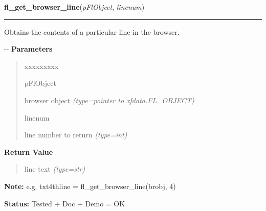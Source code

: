 \hspace{.8\funcindent}\begin{boxedminipage}{\funcwidth}

    \raggedright \textbf{fl\_get\_browser\_line}(\textit{pFlObject}, \textit{linenum})

    \vspace{-1.5ex}

    \rule{\textwidth}{0.5\fboxrule}
\setlength{\parskip}{2ex}

Obtains the contents of a particular line in the browser.

-{}-
\setlength{\parskip}{1ex}
      \textbf{Parameters}
      \vspace{-1ex}

      \begin{quote}
        \begin{Ventry}{xxxxxxxxx}

          \item[pFlObject]


browser object
            {\it (type=pointer to xfdata.FL\_OBJECT)}

          \item[linenum]


line number to return
            {\it (type=int)}

        \end{Ventry}

      \end{quote}

      \textbf{Return Value}
    \vspace{-1ex}

      \begin{quote}

line text
      {\it (type=str)}

      \end{quote}

\textbf{Note:} 
e.g. txt4thline = fl\_get\_browser\_line(brobj, 4)


\textbf{Status:} 
Tested + Doc + Demo = OK


    \end{boxedminipage}

    \label{xformslib:flbrowser:fl_load_browser}

    \vspace{0.5ex}

